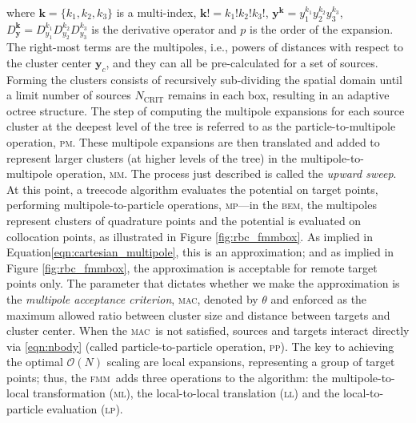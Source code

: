 \documentclass[final,3p,times]{elsarticle}
\newcommand{\bem}{\textsc{bem}\xspace}
\newcommand{\fmm}{\textsc{fmm}\xspace}
\newcommand{\bigO}{\mathcal{O}}
\newcommand{\ptom}{\textsc{p}\texttwooldstyle\textsc{m}\xspace} %
\newcommand{\ltop}{\textsc{l}\texttwooldstyle\textsc{p}\xspace} %
\newcommand{\mtop}{\textsc{m}\texttwooldstyle\textsc{p}\xspace} %
\newcommand{\mtom}{\textsc{m}\texttwooldstyle\textsc{m}\xspace} %
\newcommand{\mtol}{\textsc{m}\texttwooldstyle\textsc{l}\xspace} %
\newcommand{\ltol}{\textsc{l}\texttwooldstyle\textsc{l}\xspace}  %
\newcommand{\ptop}{\textsc{p}\texttwooldstyle\textsc{p}\xspace} %
\newcommand{\ncrit}{N_{\text{CRIT}}}
\newcommand{\mac}{\textsc{mac}}
\newcommand{\vect}[1]{\mathbf{#1}}
\begin{document}
\noindent where $\vect{k}=\{k_1, k_2, k_3\}$ is a multi-index, $\vect{k}! = k_1!k_2!k_3!$, $\vect{y}^{\vect{k}} = y_1^{k_1}y_2^{k_2}y_3^{k_3}$, $D_{\vect{y}}^{\vect{k}} = D^{k_1}_{y_1}D^{k_2}_{y_2}D^{k_3}_{y_3}$ is the derivative operator and $p$ is the order of the expansion. The right-most terms are the multipoles, i.e., powers of distances with respect to the cluster center $\vect{y}_c$, and they can all be pre-calculated for a set of sources. Forming the clusters consists of recursively sub-dividing the spatial domain until a limit number of sources $\ncrit$ remains in each box, resulting in an adaptive octree structure. 
The step of computing the multipole expansions for each source cluster at the deepest level of the tree is referred to as the particle-to-multipole operation, {\ptom}. These multipole expansions are then translated and added to represent larger clusters (at higher levels of the tree) in the multipole-to-multipole operation, {\mtom}. The process just described is called the \emph{upward sweep}.
At this point, a treecode algorithm evaluates the potential on target points, performing  multipole-to-particle operations, {\mtop}---in the \bem, the multipoles represent clusters of quadrature points and the potential is evaluated on collocation points, as illustrated in Figure \ref{fig:rbc_fmmbox}. As implied in Equation\eqref{eqn:cartesian_multipole}, this is an approximation; and as implied in Figure \ref{fig:rbc_fmmbox}, the approximation is acceptable for remote target points only. The parameter that dictates whether we make the approximation is the \emph{multipole acceptance criterion}, \mac, denoted by $\theta$ and enforced as the maximum allowed ratio between cluster size and distance between targets and cluster center. When the \mac\ is not satisfied, sources and targets interact directly via \eqref{eqn:nbody} (called particle-to-particle operation, \ptop). The key to achieving the optimal $\bigO(N)$ scaling are local expansions, representing a group of target points; thus, the \fmm\ adds three operations to the algorithm: the multipole-to-local transformation (\mtol), the local-to-local translation (\ltol) and the local-to-particle evaluation (\ltop).
\end{document}
